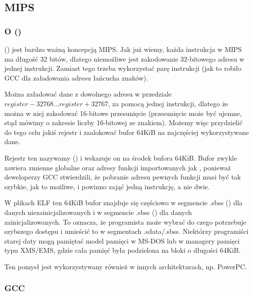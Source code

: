 \subsection{MIPS}

\subsubsection{O  ()}
\label{MIPS_GP}

 () jest bardzo ważną koncepcją MIPS.
Jak już wiemy, każda instrukcja w MIPS ma długość 32 bitów, dlatego niemożliwe jest  zakodowanie 32-bitowego adresu w jednej instrukcji. Zamiast tego trzeba wykorzystać parę instrukcji
(jak to robiło GCC dla załadowania adresu łańcucha znaków).

Można załadować dane z dowolnego adresu w przedziale $register-32768...register+32767$, za pomocą jednej instrukcji, dlatego że można w niej zakodować 16-bitowe
przesunięcie (przesunięcie może być ujemne, stąd mówimy o zakresie liczby 16-bitowej ze znakiem).
Możemy więc przydzielić do tego celu jakiś rejestr i zaalokować bufor 64KiB na najczęściej wykorzystywane dane.

Rejestr ten nazywamy  () i wskazuje on na środek bufora 64KiB.
Bufor zwykle zawiera zmienne globalne oraz adresy funkcji importowanych jak \printf, ponieważ deweloperzy GCC stwierdzili, że pobranie adresu pewnych funkcji musi być tak szybkie, jak to możliwe, i powinno zająć jedną instrukcję, a nie dwie.

W plikach ELF ten 64KiB bufor znajduje się częściowo w segmencie .sbss () dla danych niezainicjalizowanych i w segmencie .sbss () dla danych zainicjalizowanych.
To oznacza, że programista może wybrać do czego potrzebuje szybszego dostępu i umieścić to
w segmentach .sdata/.sbss.
Niektórzy programiści starej daty mogą pamiętać model pamięci w MS-DOS 
lub w managery pamięci typu XMS/EMS, gdzie cała pamięć była podzielona na bloki o długości 64KiB.

Ten pomysł jest wykorzystywany również w innych architekturach, np. PowerPC.

\subsubsection{\Optimizing GCC}

